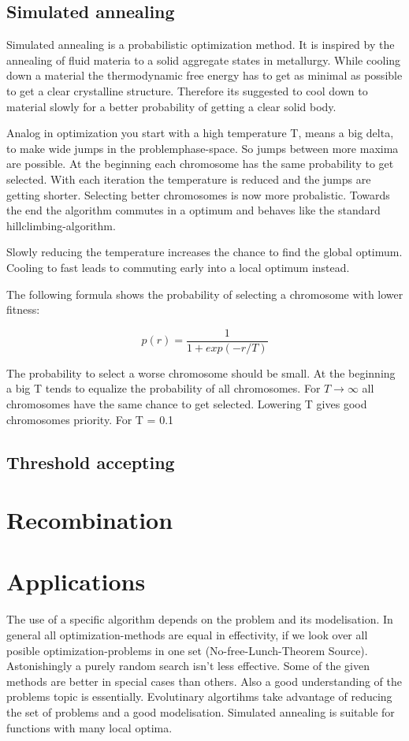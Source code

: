 \documentclass[10pt,a4paper,DIV=11]{scrreprt}
\begin{document}
\subsection{Simulated annealing}
Simulated annealing is a probabilistic optimization method.
It is inspired by the annealing of fluid materia to a solid aggregate states in metallurgy. While cooling down a material the thermodynamic free energy has to get as minimal as possible to get a clear crystalline structure. Therefore its suggested to cool down to material slowly for a better probability of getting a clear solid body.

Analog in optimization you start with a high temperature T, means a big delta, to make wide jumps in the problemphase-space. So jumps between more maxima are possible. At the beginning each chromosome has the same probability to get selected. With each iteration the temperature is reduced and the jumps are getting shorter. Selecting better chromosomes is now more probalistic.
Towards the end the algorithm commutes in a optimum and behaves like the standard hillclimbing-algorithm.

Slowly reducing the temperature increases the chance to find the global optimum. Cooling to fast leads to commuting early into a local optimum instead.

The following formula shows the probability of selecting a chromosome with lower fitness:

\begin{equation}
p(r) = \frac{1}{1+exp(-r/T)}
\end{equation} 

The probability to select a worse chromosome should be small.
At the beginning a big T tends to equalize the probability of all chromosomes. For $T \to \infty$ all chromosomes have the same chance to get selected. Lowering T gives good chromosomes priority. For T = 0.1

\subsection{Threshold accepting}

\section{Recombination}



\section{Applications}
The use of a specific algorithm depends on the problem and its modelisation. In general all optimization-methods are equal in effectivity, if we look over all posible optimization-problems in one set (No-free-Lunch-Theorem Source). Astonishingly a purely random search isn't less effective.
Some of the given methods are better in special cases than others. Also a good understanding of the problems topic is essentially. Evolutinary algortihms take advantage of reducing the set of problems and a good modelisation.
Simulated annealing is suitable for functions with many local optima.
\end{document}
